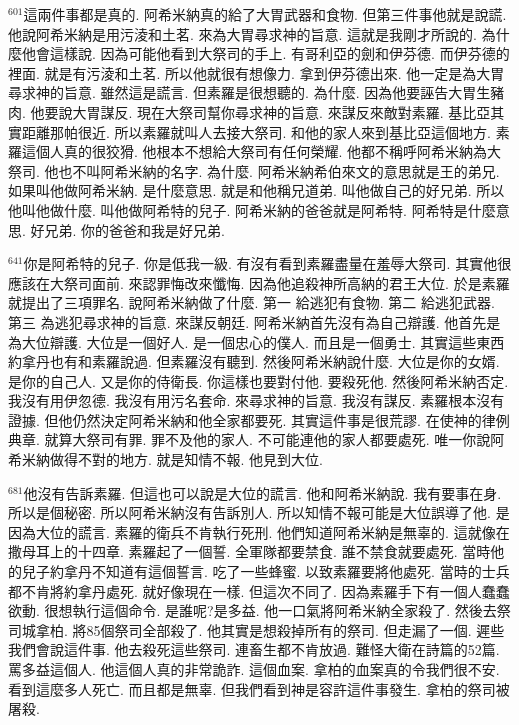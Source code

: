 \documentclass{book}
\begin{document}
$^{601}$這兩件事都是真的.
阿希米納真的給了大胃武器和食物.
但第三件事他就是說謊.
他說阿希米納是用污淩和土茗.
來為大胃尋求神的旨意.
這就是我剛才所說的.
為什麼他會這樣說.
因為可能他看到大祭司的手上.
有哥利亞的劍和伊芬德.
而伊芬德的裡面.
就是有污淩和土茗.
所以他就很有想像力.
拿到伊芬德出來.
他一定是為大胃尋求神的旨意.
雖然這是謊言.
但素羅是很想聽的.
為什麼.
因為他要誣告大胃生豬肉.
他要說大胃謀反.
現在大祭司幫你尋求神的旨意.
來謀反來敵對素羅.
基比亞其實距離那帕很近.
所以素羅就叫人去接大祭司.
和他的家人來到基比亞這個地方.
素羅這個人真的很狡猾.
他根本不想給大祭司有任何榮耀.
他都不稱呼阿希米納為大祭司.
他也不叫阿希米納的名字.
為什麼.
阿希米納希伯來文的意思就是王的弟兄.
如果叫他做阿希米納.
是什麼意思.
就是和他稱兄道弟.
叫他做自己的好兄弟.
所以他叫他做什麼.
叫他做阿希特的兒子.
阿希米納的爸爸就是阿希特.
阿希特是什麼意思.
好兄弟.
你的爸爸和我是好兄弟.

$^{641}$你是阿希特的兒子.
你是低我一級.
有沒有看到素羅盡量在羞辱大祭司.
其實他很應該在大祭司面前.
來認罪悔改來懺悔.
因為他追殺神所高納的君王大位.
於是素羅就提出了三項罪名.
說阿希米納做了什麼.
第一 給逃犯有食物.
第二 給逃犯武器.
第三 為逃犯尋求神的旨意.
來謀反朝廷.
阿希米納首先沒有為自己辯護.
他首先是為大位辯護.
大位是一個好人.
是一個忠心的僕人.
而且是一個勇士.
其實這些東西約拿丹也有和素羅說過.
但素羅沒有聽到.
然後阿希米納說什麼.
大位是你的女婿.
是你的自己人.
又是你的侍衛長.
你這樣也要對付他.
要殺死他.
然後阿希米納否定.
我沒有用伊忽德.
我沒有用污名套命.
來尋求神的旨意.
我沒有謀反.
素羅根本沒有證據.
但他仍然決定阿希米納和他全家都要死.
其實這件事是很荒謬.
在使神的律例典章.
就算大祭司有罪.
罪不及他的家人.
不可能連他的家人都要處死.
唯一你說阿希米納做得不對的地方.
就是知情不報.
他見到大位.

$^{681}$他沒有告訴素羅.
但這也可以說是大位的謊言.
他和阿希米納說.
我有要事在身.
所以是個秘密.
所以阿希米納沒有告訴別人.
所以知情不報可能是大位誤導了他.
是因為大位的謊言.
素羅的衛兵不肯執行死刑.
他們知道阿希米納是無辜的.
這就像在撒母耳上的十四章.
素羅起了一個誓.
全軍隊都要禁食.
誰不禁食就要處死.
當時他的兒子約拿丹不知道有這個誓言.
吃了一些蜂蜜.
以致素羅要將他處死.
當時的士兵都不肯將約拿丹處死.
就好像現在一樣.
但這次不同了.
因為素羅手下有一個人蠢蠢欲動.
很想執行這個命令.
是誰呢?是多益.
他一口氣將阿希米納全家殺了.
然後去祭司城拿柏.
將85個祭司全部殺了.
他其實是想殺掉所有的祭司.
但走漏了一個.
遲些我們會說這件事.
他去殺死這些祭司.
連畜生都不肯放過.
難怪大衛在詩篇的52篇.
罵多益這個人.
他這個人真的非常詭詐.
這個血案.
拿柏的血案真的令我們很不安.
看到這麼多人死亡.
而且都是無辜.
但我們看到神是容許這件事發生.
拿柏的祭司被屠殺.
\end{document}
